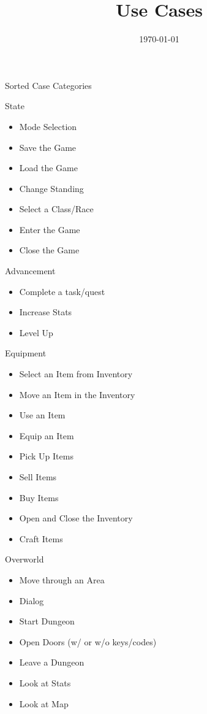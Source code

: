 \documentclass[12pt]{article}
\title{Use Cases}
\date{\today}
\begin{document}
\begin{section}{Sorted Case Categories}
\begin{subsection}{State}
\begin{itemize}
\item Mode Selection
\item Save the Game
\item Load the Game
\item Change Standing
\item Select a Class/Race
\item Enter the Game
\item Close the Game
\end{itemize}
\end{subsection}

\begin{subsection}{Advancement}
\begin{itemize}
\item Complete a task/quest
\item Increase Stats
\item Level Up
\end{itemize}
\end{subsection}

\begin{subsection}{Equipment}
\begin{itemize}
\item Select an Item from Inventory
\item Move an Item in the Inventory
\item Use an Item
\item Equip an Item
\item Pick Up Items
\item Sell Items
\item Buy Items
\item Open and Close the Inventory
\item Craft Items
\end{itemize}
\end{subsection}

\begin{subsection}{Overworld}
\begin{itemize}
\item Move through an Area
\item Dialog
\item Start Dungeon
\item Open Doors (w/ or w/o keys/codes)
\item Leave a Dungeon
\item Look at Stats
\item Look at Map
\end{itemize}
\end{subsection}


\end{section}
\end{document}
